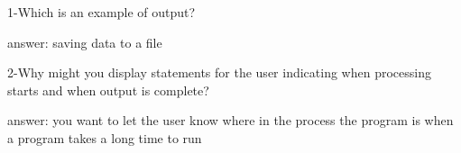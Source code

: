 1-Which is an example of output?


answer: saving data to a file

2-Why might you display statements for the user indicating when processing starts and when output is complete?


answer:  you want to let the user know where in the process the program is when a program takes a long time to run
